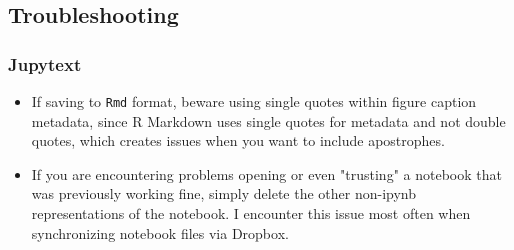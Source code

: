 \documentclass[10pt,parskip=half,
	toc=sectionentrywithdots,
	bibliography=totocnumbered,
	captions=tableheading,
    numbers=noendperiod,
    headings=standardclasses]{scrartcl}
\providecommand{\tightlist}{%
  \setlength{\itemsep}{0pt}\setlength{\parskip}{0pt}}
\begin{document}
\subsection{Troubleshooting}\label{troubleshooting}

\subsubsection{Jupytext}\label{jupytext}

\begin{itemize}
\tightlist
\item
  If saving to \texttt{Rmd} format, beware using single quotes within
  figure caption metadata, since R Markdown uses single quotes for
  metadata and not double quotes, which creates issues when you want to
  include apostrophes.
\item
  If you are encountering problems opening or even "trusting" a notebook
  that was previously working fine, simply delete the other non-ipynb
  representations of the notebook. I encounter this issue most often
  when synchronizing notebook files via Dropbox.
\end{itemize}

\setlength\bibsep{\baselineskip} %


	
\end{document}
